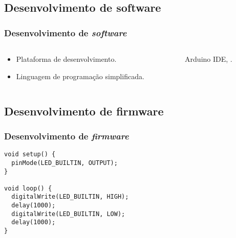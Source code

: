 \documentclass[hyperref={colorlinks=true,    
allcolors = blue,citecolor=blue}]{beamer} %
\begin{document}
\begin{frame}
\subsection{Desenvolvimento de software}
\frametitle{Desenvolvimento de \textit{software}}


\begin{columns}
    \begin{column}{0.47\textwidth}
        \begin{itemize}
            \item Plataforma de desenvolvimento.
            \item Linguagem de programação simplificada.      
        \end{itemize}
    \end{column}
    \begin{column}{0.5\textwidth}
        \begin{figure}
            \centering            
        \caption{Arduino IDE, \cite{arduinoIDE}.}
        \label{fig:enter-label}
        \end{figure}
    \end{column}
\end{columns}

\end{frame}
\begin{frame}[fragile]
\subsection{Desenvolvimento de firmware}
\frametitle{Desenvolvimento de \textit{firmware}}


\begin{verbatim}
void setup() {  
  pinMode(LED_BUILTIN, OUTPUT);
}

void loop() {
  digitalWrite(LED_BUILTIN, HIGH);  
  delay(1000);                      
  digitalWrite(LED_BUILTIN, LOW);   
  delay(1000);                      
}
\end{verbatim}


\end{frame}
\end{document}
